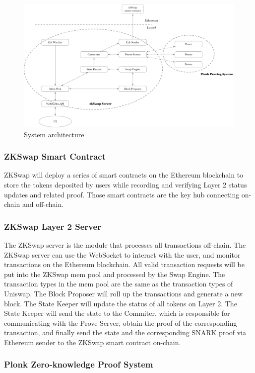 \documentclass[]{template/llncs}
\begin{document}
\begin{figure}[htbp]
\centering
\includegraphics[width=0.9\columnwidth]{figure/arch}
\caption{System architecture}
\label{fig:arch}
\end{figure}

\subsubsection{ZKSwap Smart Contract}

ZKSwap will deploy a series of smart contracts on the Ethereum blockchain to store the tokens deposited by users while recording and verifying Layer 2 status updates and related proof. Those smart contracts are the key hub connecting on-chain and off-chain.


\subsubsection{ZKSwap Layer 2 Server}

The ZKSwap server is the module that processes all transactions off-chain. The ZKSwap server can use the WebSocket to interact with the user, and monitor transactions on the Ethereum blockchain. All valid transaction requests will be put into the ZKSwap mem pool and processed by the Swap Engine. The transaction types in the mem pool are the same as the transaction types of Uniswap. 
The Block Proposer will roll up the transactions and generate a new block. The State Keeper will update the status of all tokens on Layer 2. The State Keeper will send the state to the Commiter, which is responsible for communicating with the Prove Server, obtain the proof of the corresponding transaction, and finally send the state and the corresponding SNARK proof via Ethereum sender to the ZKSwap smart contract on-chain.


\subsubsection{Plonk Zero-knowledge Proof System}
\end{document}
